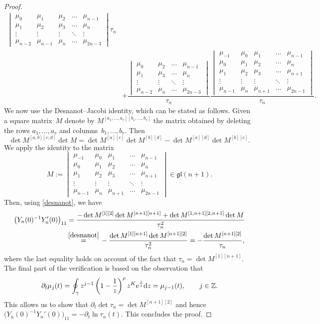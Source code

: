 \documentclass[pdftex]{sigma}
\numberwithin{equation}{section}
\theoremstyle{definition}
\def\le{\left}
\def\ri{\right}
\def \d{{\mathrm d}}
\def\nn{\nonumber}
\def\be{\begin{equation}}
\def\ee{\end{equation}}
\def\Z{{\mathbb Z}}
\def\pa{\partial}
\begin{document}
\begin{proof}
\begin{align*}
{\begin{vmatrix}
 \mu_0 & \mu_1 & \mu_2& \dots & \mu_{n-1} \\
 \mu_1 & \mu_2 & \mu_3 & \dots & \mu_{n}\\
 \vdots & \vdots & \vdots & \ddots & \vdots \\
 \mu_{n-2} & \mu_{n-1} & \mu_{n} & \dots & \mu_{2n-3}
\end{vmatrix}}{\tau_n}
\\
&+
\dfrac{\begin{vmatrix}
 \mu_0 & \mu_2 & \dots & \mu_{n-1} \\
 \mu_1 & \mu_3 & \dots & \mu_{n} \\
 \vdots & \vdots & \ddots & \vdots \\
 \mu_{n-2} & \mu_{n} & \dots & \mu_{2n-3}
\end{vmatrix}}{\tau_n}
\dfrac{\begin{vmatrix}
 \mu_{-1} & \mu_0 & \mu_1 & \dots & \mu_{n-1}\\
 \mu_0 & \mu_1 & \mu_2& \dots & \mu_{n} \\
 \mu_1 & \mu_2 & \mu_3 & \dots & \mu_{n+1} \\
 \vdots & \vdots & \vdots & \ddots & \vdots \\
 \mu_{n-1} & \mu_{n} & \mu_{n+1} & \dots & \mu_{2n-1}
 \end{vmatrix}}{\tau_n}.
\end{align*}
We now use the Desnanot--Jacobi identity, which can be stated as follows. Given a square matrix~$M$ denote by $M^{[a_1,\dots, a_r][b_1,\dots, b_r]}$ the matrix obtained by deleting the rows $a_1,\dots, a_r$ and columns~${b_1,\dots, b_r}$. Then
\be
\label{desnanot}
\det M^{[a,b][c,d]} \det M = \det M^{[a][c]} \det M^{[b][d]} - \det M^{[a][d]} \det M^{[b][c]}.
\ee
We apply the identity to the matrix
\[
M := \begin{vmatrix}
 \mu_{-1} & \mu_0 & \mu_1 & \dots & \mu_{n-1}\\
 \mu_0 & \mu_1 & \mu_2 & \dots & \mu_{n} \\
 \mu_1 & \mu_2 & \mu_3 & \dots & \mu_{n+1} \\
 \vdots & \vdots & \vdots & \ddots & \vdots \\
 \mu_{n-1}& \mu_{n}& \mu_{n+1} & \dots & \mu_{2n-1}
\end{vmatrix}\in \mathfrak{gl}(n+1).
\]
Then, using \eqref{desnanot}, we have
\begin{align*}
\bigl(Y_n(0)^{-1} Y_n'(0)\bigr)_{11}&= \frac {-\det M^{[1][2]} \det M^{[n+1][n+1]} + \det M^{[1,n+1][2,n+1]} \det M}{\tau_n^2}
\nn\\
&\mathop{=}^{\eqref{desnanot}}{}
-\frac {\det M^{[1][n+1]} \det M^{[n+1][2]}}{\tau_n^2} =- \frac { \det M^{[n+1][2]}}{\tau_n},
\end{align*}
where the last equality holds on account of the fact that $\tau_n = \det M^{[1][n+1]}$.
The final part of the verification is based on the observation that
\[
\pa_t \mu_j(t) = \oint_{\gamma} z^{j-1} \le(1-\frac 1 z\ri)^{ {\rho}} z^{{K}} {\rm e}^{\frac t z}\d z= \mu_{j-1}(t), \qquad j\in \Z.
\]
This allows us to show that
$
\pa_t \det \tau_n =\det M^{[n+1][2]}
$
and hence
$
\bigl(Y_n(0)^{-1} Y_n'(0)\bigr)_{11}= -\pa_t\ln \tau_n(t)$.
This concludes the proof.
\end{proof}
\end{document}
